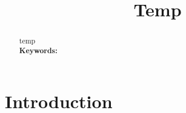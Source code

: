 \documentclass[12pt]{article}
\begin{document}
	\title{Temp}
	\maketitle
	\begin{adjustwidth}{-1cm}{-1cm}
		\begin{abstract}
			temp
			\\
			\noindent\textbf{Keywords: }
		\end{abstract}
	\end{adjustwidth}


	\newpage
	\section{Introduction}

\end{document}
